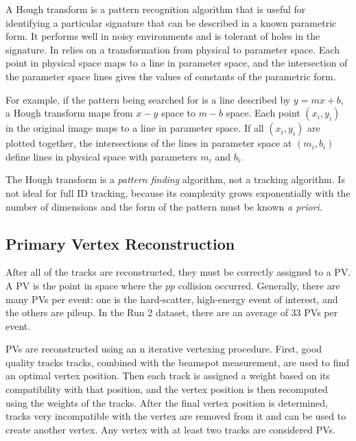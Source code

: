 
A Hough transform is a pattern recognition algorithm that is useful for identifying a particular signature that can be described in a known parametric form. It performs well in noisy environments and is tolerant of holes in the signature. In relies on a transformation from physical to parameter space. Each point in physical space maps to a line in parameter space, and the intersection of the parameter space lines gives the values of constants of the parametric form. 

For example, if the pattern being searched for is a line described by $y = mx + b$, a Hough transform maps from $x-y$ space to $m-b$ space. Each point $(x_i, y_i)$ in the original image maps to a line in parameter space. If all $(x_i, y_i)$ are plotted together, the intersections of the lines in parameter space at $(m_i, b_i)$ define lines in physical space with parameters $m_i$ and $b_i$. 

The Hough transform is a \emph{pattern finding} algorithm, not a tracking algorithm. Is not ideal for full \ac{ID} tracking, because its complexity grows exponentially with the number of dimensions and the form of the pattern must be known \emph{a priori}.



\subsection{Primary Vertex Reconstruction}

After all of the tracks are reconstructed, they must be correctly assigned to a \ac{PV}. A \ac{PV} is the point in space where the $pp$ collision occurred. Generally, there are many \ac{PVs} per event: one is the hard-scatter, high-energy event of interest, and the others are pileup. In the Run 2 dataset, there are an average of 33 \ac{PVs} per event.

\ac{PVs} are reconstructed using an n iterative vertexing procedure. First, good quality tracks tracks, combined with the beamspot measurement, are used to find an optimal vertex position. Then each track is assigned a weight based on its compatibility with that position, and the vertex position is then recomputed using the weights of the tracks. After the final vertex position is determined, tracks very incompatible with the vertex are removed from it and can be used to create another vertex. Any vertex with at least two tracks are considered \ac{PVs}.



